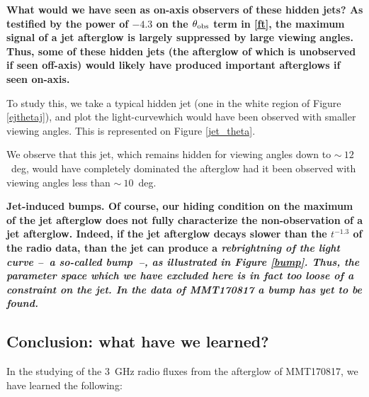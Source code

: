 \bf{What would we have seen as on-axis observers of these hidden jets?} As testified by the power of $-4.3$ on the $\theta_{\mathrm{obs}}$ term in \ref{ft}, the maximum signal of a jet afterglow is largely suppressed by large viewing angles. Thus, some of these hidden jets (the afterglow of which is unobserved if seen off-axis) would likely have produced important afterglows if seen on-axis.

To study this, we take a typical hidden jet (one in the white region of Figure \ref{ejthetaj}), and plot the light-curvewhich would have been observed with smaller viewing angles. This is represented on Figure \ref{jet_theta}.


We observe that this jet, which remains hidden for viewing angles down to $\sim~12$~deg, would have completely dominated the afterglow had it been observed with viewing angles less than $\sim~10$~deg.


\bf{Jet-induced bumps.} Of course, our hiding condition on the maximum of the jet afterglow does not fully characterize the non-observation of a jet afterglow. Indeed, if the jet afterglow decays slower than the $t^{-1.3}$ of the radio data, than the jet can produce a \it{rebrightning} of the light curve --~a so-called \it{bump}~--, as illustrated in Figure \ref{bump}. Thus, the parameter space which we have excluded here is in fact too loose of a constraint on the jet. In the data of MMT170817 a bump has yet to be found.



\subsection{Conclusion: what have we learned?}

In the studying of the 3~GHz radio fluxes from the afterglow of MMT170817, we have learned the following:

